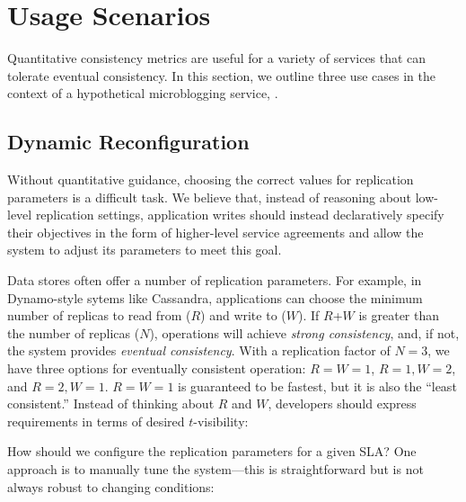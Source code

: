 \section{Usage Scenarios}
\label{sec:scenarios}

Quantitative consistency metrics are useful for a variety of services
that can tolerate eventual consistency. In this section, we outline
three use cases in the context of a hypothetical microblogging
service, {\systemname}.

\subsection{Dynamic Reconfiguration}
\label{sec:dynamic}

Without quantitative guidance, choosing the correct values for
replication parameters is a difficult task. We believe that, instead
of reasoning about low-level replication settings, application writes
should instead declaratively specify their objectives in the form of
higher-level service agreements and allow the system to adjust its
parameters to meet this goal.

Data stores often offer a number of replication parameters. For
example, in Dynamo-style sytems like Cassandra, applications can
choose the minimum number of replicas to read from ($R$) and write to
($W$). If $R$+$W$ is greater than the number of replicas ($N$),
operations will achieve \textit{strong consistency}, and, if not, the
system provides \textit{eventual consistency}. With a replication
factor of $N=3$, we have three options for eventually consistent
operation: $R$$=$$W$$=$$1$, $R$$=$$1$$, W$$=$$2$, and $R$$=$$2$$,
W$$=$$1$.  $R$$=$$W$$=$$1$ is guaranteed to be fastest, but it is also
the ``least consistent.'' Instead of thinking about $R$ and $W$,
developers should express requirements in terms of desired
$t$-visibility:


How should we configure the replication parameters for a given SLA?
One approach is to manually tune the system---this is straightforward
but is not %
always robust to changing conditions:


